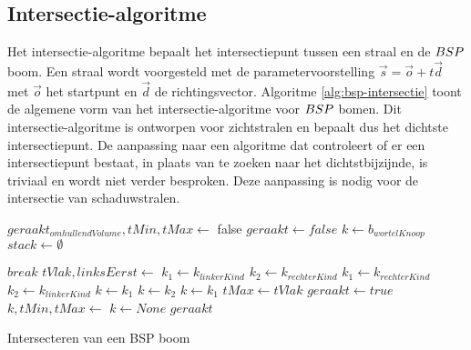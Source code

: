 \subsection{Intersectie-algoritme}
Het intersectie-algoritme bepaalt het intersectiepunt tussen een straal en de $BSP$ boom.
Een straal wordt voorgesteld met de parametervoorstelling $\vec{s} = \vec{o} + t\vec{d}$ met $\vec{o}$ het startpunt en $\vec{d}$ de richtingsvector.
Algoritme \ref{alg:bsp-intersectie} toont de algemene vorm van het intersectie-algoritme voor $BSP$ bomen.
Dit intersectie-algoritme is ontworpen voor zichtstralen en bepaalt dus het dichtste intersectiepunt.
De aanpassing naar een algoritme dat controleert of er een intersectiepunt bestaat, in plaats van te zoeken naar het dichtstbijzijnde, is triviaal en wordt niet verder besproken.
Deze aanpassing is nodig voor de intersectie van schaduwstralen.\\

\begin{dutchalgorithm}
    \begin{algorithmic}       
            \State $geraakt_{omhullendVolume}, tMin, tMax \gets $ 
                \State \Return false
            \EndIf
            \State $geraakt \gets false$
            \State $k \gets b_{wortelKnoop}$
            \State $stack\gets \emptyset$

                    \State $break$
                \EndIf
                    \State $tVlak, linksEerst \gets$ 
                        \State $k_1 \gets k_{linkerKind}$
                        \State $k_2 \gets k_{rechterKind}$
                    \Else
                        \State $k_1 \gets k_{rechterKind}$
                        \State $k_2 \gets k_{linkerKind}$
                    \EndIf
                        \State $k \gets k_1$
                        \State $k \gets k_2$
                    \Else
                        \State {}
                        \State $k \gets k_1$
                        \State $tMax \gets tVlak$ 
                    \EndIf
                \Else
                        \State $geraakt \gets true$
                    \EndIf
                        \State $k, tMin, tMax \gets $
                    \Else
                        \State $k \gets None$
                    \EndIf
                \EndIf
            \EndWhile
            \State \Return $geraakt$
        \EndFunction
    \end{algorithmic}
    \caption{Intersecteren van een BSP boom}
    \label{alg:bsp-intersectie}

\end{dutchalgorithm}  

